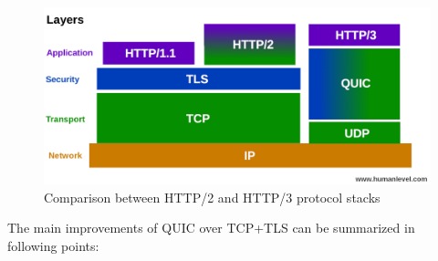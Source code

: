 \begin{figure}[h]\label{fig:http2-vs-http3-stack}
  \centering
  \includegraphics[width=\textwidth]{img/01-pile-http-protocol}
  \caption{Comparison between HTTP/2 and HTTP/3 protocol stacks}
\end{figure}

The main improvements of QUIC over TCP+TLS can be summarized in following points:

